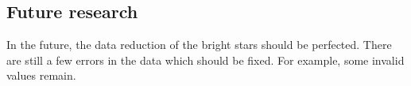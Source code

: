\documentclass[onecolumn]{aa} %
\begin{document}

\subsection{Future research}
In the future, the data reduction of the bright stars should be perfected. There are still a few errors in the data which should be fixed. For example, some invalid values remain.
\end{document}
